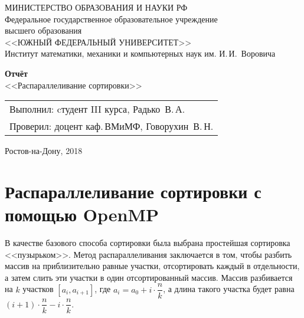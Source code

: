 \documentclass[12pt]{article}
\begin{document}
\thispagestyle{empty}
\begin{centering}

МИНИСТЕРСТВО ОБРАЗОВАНИЯ И НАУКИ РФ\\
Федеральное государственное образовательное учреждение\\ высшего образования\\
<<ЮЖНЫЙ ФЕДЕРАЛЬНЫЙ УНИВЕРСИТЕТ>> \\
\vspace{1cm}
Институт математики, механики и компьютерных наук им. И.\,И.~Воровича\\
\vspace{6cm}

{\Large \textbf{Отчёт} } \\
<<Распараллеливание сортировки>>\\
\end{centering}

\vfill

\begin{flushright}
\begin{tabular}{l}
Выполнил: cтудент III курса, {Радько~В.\,А.} \\
Проверил: доцент каф.\,ВМиМФ, {Говорухин~В.\,Н.} \\
\end{tabular}
\end{flushright}

\vspace{4cm}

\begin{centering}
Ростов-на-Дону, 2018\\
\end{centering}

\newpage

\tableofcontents

\newpage

\section{Распараллеливание сортировки с помощью OpenMP}

В качестве базового способа сортировки была выбрана простейшая сортировка <<пузырьком>>. Метод распараллеливания заключается в том, чтобы разбить массив на приблизительно равные участки, отсортировать каждый в отдельности, а затем слить эти участки в один отсортированный массив. Массив разбивается на $k$ участков $[a_i, a_{i+1}]$, где $a_i = a_0 + i\cdot\dfrac{n}{k}$, а длина такого участка будет равна $(i+1)\cdot\dfrac{n}{k} - i\cdot\dfrac{n}{k}$.
\end{document}
